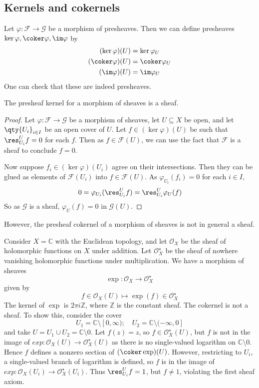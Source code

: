 \subsection{Kernels and cokernels}
Let \( \varphi : \mathcal F \to \mathcal G \) be a morphism of presheaves.
Then we can define presheaves \( \ker \varphi, \coker \varphi, \im \varphi \) by
\begin{align*}
    (\ker \varphi)(U) &= \ker \varphi_U \\
    (\coker \varphi)(U) &= \coker \varphi_U \\
    (\im \varphi)(U) &= \im \varphi_U
\end{align*}
One can check that these are indeed presheaves.
\begin{proposition}
    The presheaf kernel for a morphism of sheaves is a sheaf.
\end{proposition}
\begin{proof}
    Let \( \varphi : \mathcal F \to \mathcal G \) be a morphism of sheaves, let \( U \subseteq X \) be open, and let \( \qty{U_i}_{i \in I} \) be an open cover of \( U \).
    Let \( f \in (\ker \varphi)(U) \) be such that \( \res^U_{U_i} f = 0 \) for each \( f \).
    Then as \( f \in \mathcal F(U) \), we can use the fact that \( \mathcal F \) is a sheaf to conclude \( f = 0 \).

    Now suppose \( f_i \in (\ker \varphi)(U_i) \) agree on their intersections.
    Then they can be glued as elements of \( \mathcal F(U_i) \) into \( f \in \mathcal F(U) \).
    As \( \varphi_{U_i}(f_i) = 0 \) for each \( i \in I \),
    \[ 0 = \varphi_{U_i}(\res_{U_i}^U f) = \res_{U_i}^U \varphi_U(f) \]
    So as \( \mathcal G \) is a sheaf, \( \varphi_U(f) = 0 \) in \( \mathcal G(U) \).
\end{proof}
However, the presheaf cokernel of a morphism of sheaves is not in general a sheaf.
\begin{example}
    Consider \( X = \mathbb C \) with the Euclidean topology, and let \( \mathcal O_X \) be the sheaf of holomorphic functions on \( X \) under addition.
    Let \( \mathcal O_X^\star \) be the sheaf of nowhere vanishing holomorphic functions under multiplication.
    We have a morphism of sheaves
    \[ \exp : \mathcal O_X \to \mathcal O_X^\star \]
    given by
    \[ f \in \mathcal O_X(U) \mapsto \exp(f) \in \mathcal O_X^\star \]
    The kernel of \( \exp \) is \( 2\pi i \mathbb Z \), where \( \mathbb Z \) is the constant sheaf.
    The cokernel is not a sheaf.
    To show this, consider the cover
    \[ U_1 = \mathbb C \setminus [0, \infty);\quad U_2 = \mathbb C \setminus (-\infty, 0] \]
    and take \( U = U_1 \cup U_2 = \mathbb C \setminus \qty{0} \).
    Let \( f(z) = z \), so \( f \in \mathcal O_X^\star(U) \), but \( f \) is not in the image of \( exp : \mathcal O_X(U) \to \mathcal O_X^\star(U) \) as there is no single-valued logarithm on \( \mathbb C \setminus \qty{0} \).
    Hence \( f \) defines a nonzero section of \( (\coker \exp)(U) \).
    However, restricting to \( U_i \), a single-valued branch of logarithm is defined, so \( f \) is in the image of \( exp : \mathcal O_X(U_i) \to \mathcal O_X^\star(U_i) \).
    Thus \( \res_{U_i}^U f = 1 \), but \( f \neq 1 \), violating the first sheaf axiom.
\end{example}
